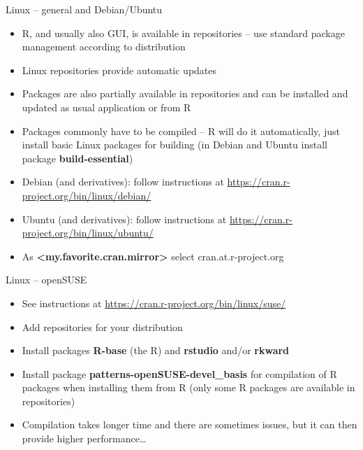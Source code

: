\documentclass[compress, ucs, xelatex, 11pt, xcolor=svgnames,
  hyperref={
    bookmarks=true,
    unicode=true,
    colorlinks=true,
    pdftitle={Molecular data in R},
    plainpages=false,
    pdfauthor={Vojtech Zeisek},
    pdfsubject={Course about phylogeny and evolution in R},
    pdfcreator={XeLaTeX},
    pdfkeywords={R, evolution, phylogeny, molecular data},
    linkcolor=Tomato,
    anchorcolor=SaddleBrown,
    citecolor=Goldenrod,
    filecolor=DarkMagenta,
    menucolor=Sienna,
    urlcolor=DarkTurquoise,
    pdftex},
  url={hyphens, lowtilde} %
  ]{beamer}
\begin{document}
\begin{frame}{Linux -- general and Debian/Ubuntu}
\begin{itemize}
 \item R, and usually also GUI, is available in repositories -- use standard package management according to distribution
 \item Linux repositories provide automatic updates
 \item Packages are also partially available in repositories and can be installed and updated as usual application or from R
 \item Packages commonly have to be compiled -- R will do it automatically, just install basic Linux packages for building (in Debian and Ubuntu install package \textbf{build-essential})
 \item Debian (and derivatives): follow instructions at \url{https://cran.r-project.org/bin/linux/debian/}
 \item Ubuntu (and derivatives): follow instructions at \url{https://cran.r-project.org/bin/linux/ubuntu/}
 \item As \textbf{<my.favorite.cran.mirror>} select \alert{cran.at.r-project.org}
\end{itemize}
\end{frame}

\begin{frame}{Linux -- openSUSE}
\begin{itemize}
 \item See instructions at \url{https://cran.r-project.org/bin/linux/suse/}
 \item Add repositories for your distribution
 \begin{itemize}
 \end{itemize}
 \item Install packages \textbf{R-base} (the R) and \textbf{rstudio} and/or \textbf{rkward}
 \item Install package \textbf{patterns-openSUSE-devel\_basis} for compilation of R packages when installing them from R (only some R packages are available in repositories)
 \item Compilation takes longer time and there are sometimes issues, but it can then provide higher performance\ldots
\end{itemize}
\end{frame}
\end{document}
